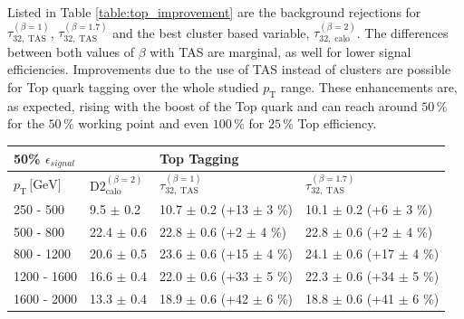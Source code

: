 Listed in Table \ref{table:top_improvement} are the background rejections for $\tau_{32,\;\text{TAS}}^{(\beta=1)}$, $\tau_{32,\;\text{TAS}}^{(\beta=1.7)}$ and the best cluster based variable, $\tau_{32,\;\text{calo}}^{(\beta=2)}$. The differences between both values of $\beta$ with TAS are marginal, as well for lower signal efficiencies. Improvements due to the use of TAS instead of clusters are possible for Top quark tagging over the whole studied $p_{\mathrm{T}}$ range. These enhancements are, as expected, rising with the boost of the Top quark and can reach around $50\,\%$ for the $50\,\%$ working point and even $100\,\%$ for $25\,\%$ Top efficiency.
\begin{table}
\centering
\begin{tabular}{llll}
 \multicolumn{1}{l||}{\textbf{50\% $\epsilon_{signal}$}} &                                                & \textbf{Top Tagging}                                          &                                          \\ \hline
\multicolumn{1}{l||}{$p_{\mathrm{T}} \, \text{[GeV]}$}           & \multicolumn{1}{l|}{$\text{D2}_{\text{calo}}^{(\beta=2)}$} & \multicolumn{1}{l|}{$\tau_{32,\;\text{TAS}}^{(\beta=1)}$} & \multicolumn{1}{l|}{$\tau_{32,\;\text{TAS}}^{(\beta=1.7)}$} \\ \hline \hline
\multicolumn{1}{l||}{250 - 500}                       & \multicolumn{1}{l|}{9.5 $\pm$ 0.2}                      &  \multicolumn{1}{l|}{10.7 $\pm$ 0.2 (+13 $\pm$ 3 \%)}        & \multicolumn{1}{l|}{10.1 $\pm$ 0.2 (+6 $\pm$ 3 \%)}        \\
\multicolumn{1}{l||}{500 - 800}                       & \multicolumn{1}{l|}{22.4 $\pm$ 0.6}                      & \multicolumn{1}{l|}{22.8 $\pm$ 0.6 (+2 $\pm$ 4 \%)}         & \multicolumn{1}{l|}{22.8 $\pm$ 0.6 (+2 $\pm$ 4 \%)}         \\
\multicolumn{1}{l||}{800 - 1200}                      & \multicolumn{1}{l|}{20.6 $\pm$ 0.5}                      & \multicolumn{1}{l|}{23.6 $\pm$ 0.6 (+15 $\pm$ 4 \%)}        & \multicolumn{1}{l|}{24.1 $\pm$ 0.6 (+17 $\pm$ 4 \%)}        \\
\multicolumn{1}{l||}{1200 - 1600}                     & \multicolumn{1}{l|}{16.6 $\pm$ 0.4}                      & \multicolumn{1}{l|}{22.0 $\pm$ 0.6 (+33 $\pm$ 5 \%)}        & \multicolumn{1}{l|}{22.3 $\pm$ 0.6 (+34 $\pm$ 5 \%)}        \\
\multicolumn{1}{l||}{1600 - 2000}                     & \multicolumn{1}{l|}{13.3 $\pm$ 0.4}                      & \multicolumn{1}{l|}{18.9 $\pm$ 0.6 (+42 $\pm$ 6 \%)}        & \multicolumn{1}{l|}{18.8 $\pm$ 0.6 (+41 $\pm$ 6 \%)}       \\ 

\end{tabular}
\end{table}

